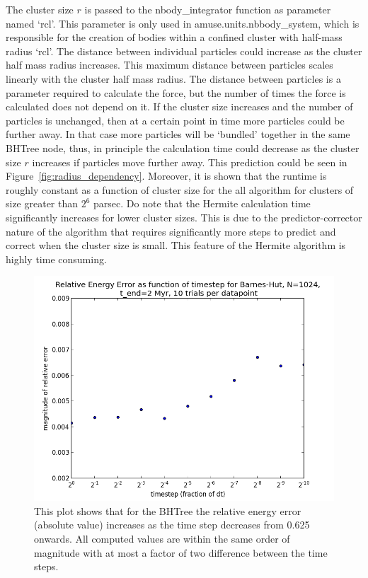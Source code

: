 \documentclass{aa}
\begin{document}
The cluster size $r$ is passed to the nbody\_integrator function as parameter named `rcl'. This parameter is only used in amuse.units.nbbody\_system, which is responsible for the creation of bodies within a confined cluster with half-mass radius `rcl'. The distance between individual particles could increase  as the cluster half mass radius increases. This maximum distance between particles scales linearly with the cluster half mass radius. The distance between particles is a parameter required to calculate the force, but the number of times the force is
  calculated does not depend on it. If the cluster size increases and the number of particles is unchanged, then at a certain point in time more particles could be further away. In that case more particles will be `bundled' together in the same BHTree node, thus, in principle the calculation time could decrease as the cluster size $r$ increases if particles move further away. This prediction could be seen in Figure~\ref{fig:radius_dependency}. Moreover, it is shown that the runtime is roughly constant as a function of cluster size for the all algorithm for clusters of size greater than $2^6$ parsec. Do note that the Hermite calculation time significantly increases for lower cluster sizes. This is due to the predictor-corrector nature of the algorithm that requires significantly more steps to predict and correct when the cluster size is small. This feature of the Hermite algorithm is highly time consuming.


   \begin{figure}
   \centering
   \includegraphics[width=\hsize]{img/error_for_timestep.png}
      \caption{This plot shows that for the BHTree the relative energy error (absolute value) increases as the time step decreases from 0.625 onwards. 
      	 	   All computed values are within the same order of magnitude with at most a factor of two difference between the time steps.
                    }
         \label{fig:timestep_dependency}
   \end{figure}
\end{document}
